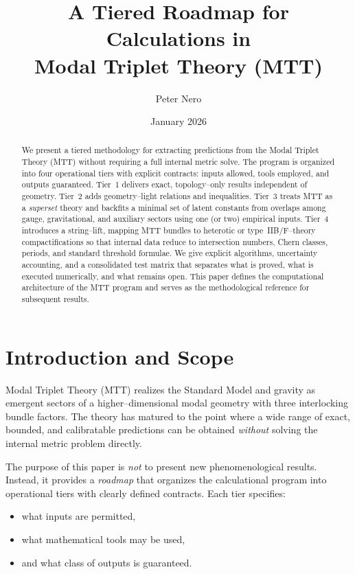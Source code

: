 \documentclass[11pt]{article}
\title{A Tiered Roadmap for Calculations in\\
Modal Triplet Theory (MTT)}
\author{Peter Nero}
\date{January 2026}
\begin{document}
\maketitle

\begin{abstract}
We present a tiered methodology for extracting predictions from the Modal
Triplet Theory (MTT) without requiring a full internal metric solve.
The program is organized into four operational tiers with explicit
contracts: inputs allowed, tools employed, and outputs guaranteed.
Tier~1 delivers exact, topology--only results independent of geometry.
Tier~2 adds geometry--light relations and inequalities.
Tier~3 treats MTT as a \emph{superset} theory and backfits a minimal set
of latent constants from overlaps among gauge, gravitational, and
auxiliary sectors using one (or two) empirical inputs.
Tier~4 introduces a string--lift, mapping MTT bundles to heterotic or
type~IIB/F--theory compactifications so that internal data reduce to
intersection numbers, Chern classes, periods, and standard threshold
formulae.
We give explicit algorithms, uncertainty accounting, and a consolidated
test matrix that separates what is proved, what is executed numerically,
and what remains open.
This paper defines the computational architecture of the MTT program and
serves as the methodological reference for subsequent results.
\end{abstract}

\tableofcontents
\newpage

\section{Introduction and Scope}

Modal Triplet Theory (MTT) realizes the Standard Model and gravity as
emergent sectors of a higher--dimensional modal geometry with three
interlocking bundle factors.
The theory has matured to the point where a wide range of exact,
bounded, and calibratable predictions can be obtained \emph{without}
solving the internal metric problem directly.

The purpose of this paper is \emph{not} to present new phenomenological
results.
Instead, it provides a \emph{roadmap} that organizes the calculational
program into operational tiers with clearly defined contracts.
Each tier specifies:
\begin{itemize}
  \item what inputs are permitted,
  \item what mathematical tools may be used,
  \item and what class of outputs is guaranteed.
\end{itemize}
\end{document}
